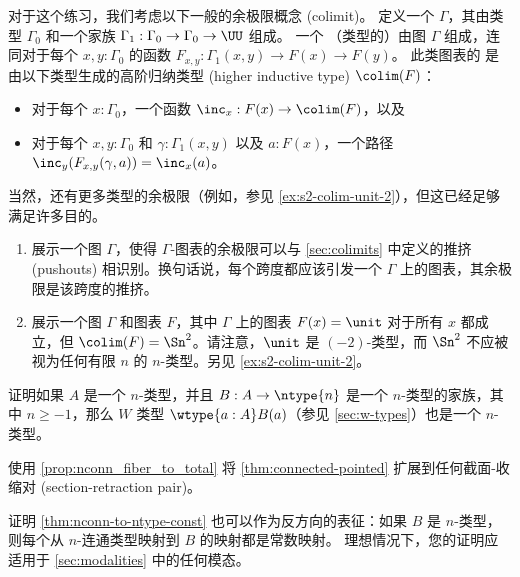 \begin{ex}\label{ex:s2-colim-unit}
对于这个练习，我们考虑以下一般的余极限概念 (colimit)。
定义一个  $\Gamma$，其由类型 $\Gamma_0$ 和一个家族 $\Gamma_1 : \Gamma_0 \to \Gamma_0 \to \UU$ 组成。
一个 （类型的）由图 $\Gamma$ 组成，连同对于每个 $x,y:\Gamma_0$ 的函数 $F_{x,y}:\Gamma_1(x,y) \to F(x) \to F(y)$。
此类图表的  是由以下类型生成的高阶归纳类型 (higher inductive type) $\colim(F)$：
\begin{itemize}
    \item 对于每个 $x:\Gamma_0$，一个函数 $\inc_x:F(x) \to \colim(F)$，以及
    \item 对于每个 $x,y:\Gamma_0$ 和 $\gamma:\Gamma_1(x,y)$ 以及 $a:F(x)$，一个路径 $\inc_y(F_{x,y}(\gamma,a)) = \inc_x(a)$。
\end{itemize}
当然，还有更多类型的余极限（例如，参见 \cref{ex:s2-colim-unit-2}），但这已经足够满足许多目的。
\begin{enumerate}
    \item 展示一个图 $\Gamma$，使得 $\Gamma$-图表的余极限可以与 \cref{sec:colimits} 中定义的推挤 (pushouts) 相识别。换句话说，每个跨度都应该引发一个 $\Gamma$ 上的图表，其余极限是该跨度的推挤。
    \item 展示一个图 $\Gamma$ 和图表 $F$，其中 $\Gamma$ 上的图表 $F(x)=\unit$ 对于所有 $x$ 都成立，但 $\colim(F)=\Sn^2$。请注意，$\unit$ 是 $(-2)$-类型，而 $\Sn^2$ 不应被视为任何有限 $n$ 的 $n$-类型。另见 \cref{ex:s2-colim-unit-2}。
\end{enumerate}
\end{ex}

\begin{ex}\label{ex:ntypes-closed-under-wtypes}
证明如果 $A$ 是一个 $n$-类型，并且 $B:A\to \ntype{n}$ 是一个 $n$-类型的家族，其中 $n\ge -1$，那么 $W$ 类型 $\wtype{a:A} B(a)$（参见 \cref{sec:w-types}）也是一个 $n$-类型。
\end{ex}

\begin{ex}\label{ex:connected-pointed-all-section-retraction}
使用 \cref{prop:nconn_fiber_to_total} 将 \cref{thm:connected-pointed} 扩展到任何截面-收缩对 (section-retraction pair)。
\end{ex}

\begin{ex}\label{ex:ntype-from-nconn-const}
证明 \cref{thm:nconn-to-ntype-const} 也可以作为反方向的表征：如果 $B$ 是 $n$-类型，则每个从 $n$-连通类型映射到 $B$ 的映射都是常数映射。
理想情况下，您的证明应适用于 \cref{sec:modalities} 中的任何模态。
\end{ex}

